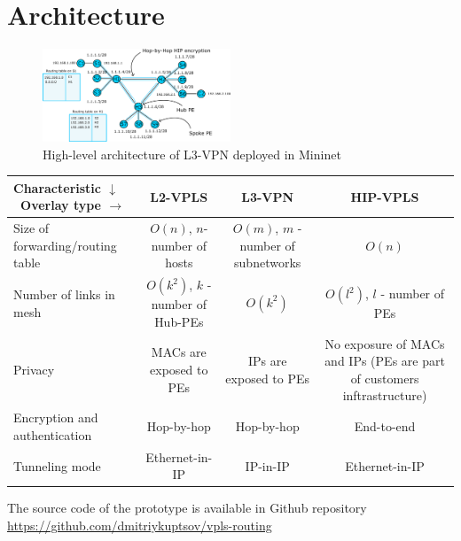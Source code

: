 \section{Architecture}
\label{section:architecture}


\begin{figure}[!h]
	\includegraphics[width=0.5\textwidth]{graphics/arch.png}
	\caption{High-level architecture of L3-VPN deployed in Mininet}
	\label{fig:arch}
\end{figure}

\begin{table}
        \begin{tabular}{|l|c|c|c|}
        \hline
        Characteristic $\downarrow$ \ Overlay type $\rightarrow$ & L2-VPLS & L3-VPN & HIP-VPLS \\\hline
        Size of forwarding/routing table & $O(n)$, $n$-number of hosts & $O(m)$, $m$ - number of subnetworks & $O(n)$\\\hline
        Number of links in mesh & $O(k^2)$, $k$ - number of Hub-PEs & $O(k^2)$ & $O(l^2)$, $l$ - number of PEs \\\hline
        Privacy & MACs are exposed to PEs & IPs are exposed to PEs & No exposure of MACs and IPs (PEs are part of customers inftrastructure) \\\hline
        Encryption and authentication & Hop-by-hop & Hop-by-hop & End-to-end \\\hline
        Tunneling mode & Ethernet-in-IP & IP-in-IP & Ethernet-in-IP \\\hline
        \end{tabular}
        \label{tab:analysis}
\end{table}


The source code of the prototype is available in Github repository \url{https://github.com/dmitriykuptsov/vpls-routing}

~\cite{radiusmysql}
